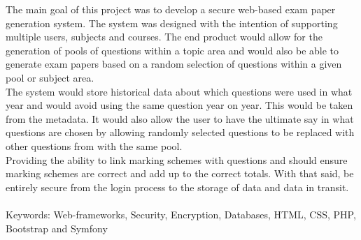 

\begin{comment}
Despite the fact that an abstract is quite brief, it must do almost as much work as the multi-page
paper that follows it. In a computer science paper, this means that it should in most cases include
the following sections. Each section is typically a single sentence, although there is room for
creativity. In particular, the parts may be merged or spread among a set of sentences. Use the
following as a checklist for your next abstract (URL:
http://www.ece.cmu.edu/~koopman/essays/abstract.html):
\end{comment}

The main goal of this project was to develop a secure web-based exam paper generation system. The system was designed with the intention of supporting multiple users, subjects and courses. The end product would allow for the generation of pools of questions within a topic area and would also be able to generate exam papers based on a random selection of questions within a given pool or subject area. \\ The system would store historical data about which questions were used in what year and would avoid using the same question year on year. This would be taken from the metadata. It would also allow the user to have the ultimate say in what questions are chosen by allowing randomly selected questions to be replaced with other questions from with the same pool. \\ Providing the ability to link marking schemes with questions and should ensure marking schemes are correct and add up to the correct totals. With that said, be entirely secure from the login process to the storage of data and data in transit. \\ \\
Keywords: Web-frameworks, Security, Encryption, Databases, HTML, CSS, PHP, Bootstrap and Symfony

